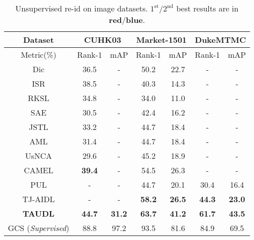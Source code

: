 \documentclass[runningheads]{llncs}
\begin{document}
\begin{table}[h]
	\centering
	\setlength{\tabcolsep}{0.2cm}
	\caption{Unsupervised re-id on image datasets. 
		$1^\text{st}$/$2^\text{nd}$ best results are in \textbf{\color{red}red}/\textbf{\color{blue}blue}.}
	\label{tab:img_SOTA}
	\begin{tabular}
		{c||c|c||c|c||c|c}
		\hline
		{Dataset}						
		& \multicolumn{2}{c||}{CUHK03\cite{li2014deepreid}}      
		& \multicolumn{2}{c||}{Market-1501\cite{zheng2015scalable}}                    	
		& \multicolumn{2}{c}{DukeMTMC\cite{zheng2017unlabeled}}    						\\ \hline 
		{Metric(\%)}		& Rank-1	& mAP		& Rank-1	& mAP 		& Rank-1	& mAP
		\\ \hline \hline
		Dic\cite{kodirov2015dictionary}	& 36.5	& -         & 50.2	& 22.7		& - 		& -
		\\
		ISR\cite{lisanti2015person}		& 38.5   & -         & 40.3 	& 14.3 		& -         & - 
		\\ 
		RKSL\cite{wang2016towards}		& 34.8   & -         & 34.0   & 11.0          & -         & - 
		\\ \hline
		SAE\cite{lee2008sparse}			& 30.5   & -         & 42.4   & 16.2          & -         & -
		\\
		JSTL\cite{xiao2016learning}		& 33.2   & -         & 44.7   & 18.4          & -       	& - 
		\\
		AML\cite{ye2007adaptive}			& 31.4	& -         & 44.7   & 18.4		& -        & - 
		\\
		UsNCA\cite{qin2015unsupervised}	& 29.6	& -         & 45.2   & 18.9		& -        & - 
		\\
		CAMEL \cite{yu2017cross}		
		& \textbf{\color{blue}39.4} 		& -       
		& {54.5} 					& {26.3} 
		& -                             	 	& -
		\\
		PUL \cite{fan2017unsupervised}	
		& -                     & -                             
		& 44.7                & 20.1           
		& 30.4			& 16.4        	    	
		\\ 
		TJ-AIDL \cite{want2018Transfer}
		& - 				& - 
		&\bf \color{blue} 58.2 	&\bf\color{blue} 26.5 
		&\bf\color{blue} 44.3 		&\bf\color{blue} 23.0 \\
		\hline
		\textbf{TAUDL}                                	
		& \textbf{\color{red}44.7} 	& \textbf{\color{red}31.2} 
		& \textbf{\color{red}63.7}	& \textbf{\color{red}41.2} 
		& \textbf{\color{red}61.7} 	& \textbf{\color{red}43.5}
		\\ \hline
		GCS \cite{chen2018group}({\em Supervised})	& 88.8	& 97.2         & 93.5	& 81.6		& 84.9 	& 69.5
		\\ \hline
	\end{tabular}
\end{table}
\end{document}
